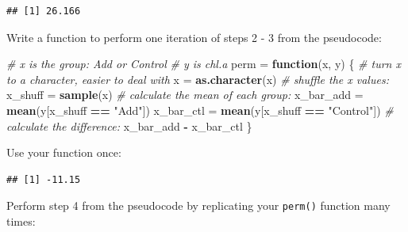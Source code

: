 \documentclass[]{book}
\newenvironment{Shaded}{\begin{snugshade}}{\end{snugshade}}
\newcommand{\KeywordTok}[1]{\textcolor[rgb]{0.13,0.29,0.53}{\textbf{#1}}}
\newcommand{\DataTypeTok}[1]{\textcolor[rgb]{0.13,0.29,0.53}{#1}}
\newcommand{\DecValTok}[1]{\textcolor[rgb]{0.00,0.00,0.81}{#1}}
\newcommand{\StringTok}[1]{\textcolor[rgb]{0.31,0.60,0.02}{#1}}
\newcommand{\CommentTok}[1]{\textcolor[rgb]{0.56,0.35,0.01}{\textit{#1}}}
\newcommand{\ControlFlowTok}[1]{\textcolor[rgb]{0.13,0.29,0.53}{\textbf{#1}}}
\newcommand{\OperatorTok}[1]{\textcolor[rgb]{0.81,0.36,0.00}{\textbf{#1}}}
\newcommand{\NormalTok}[1]{#1}
\theoremstyle{definition}
\theoremstyle{definition}
\theoremstyle{definition}
\theoremstyle{remark}
\begin{document}
\begin{verbatim}
## [1] 26.166
\end{verbatim}

Write a function to perform one iteration of steps 2 - 3 from the
pseudocode:

\begin{Shaded}
\begin{Highlighting}[]
\CommentTok{# x is the group: Add or Control}
\CommentTok{# y is chl.a}
\NormalTok{perm =}\StringTok{ }\ControlFlowTok{function}\NormalTok{(x, y) \{}
  \CommentTok{# turn x to a character, easier to deal with}
\NormalTok{  x =}\StringTok{ }\KeywordTok{as.character}\NormalTok{(x)}
  \CommentTok{# shuffle the x values:}
\NormalTok{  x_shuff =}\StringTok{ }\KeywordTok{sample}\NormalTok{(x)}
  \CommentTok{# calculate the mean of each group:}
\NormalTok{  x_bar_add =}\StringTok{ }\KeywordTok{mean}\NormalTok{(y[x_shuff }\OperatorTok{==}\StringTok{ "Add"}\NormalTok{])}
\NormalTok{  x_bar_ctl =}\StringTok{ }\KeywordTok{mean}\NormalTok{(y[x_shuff }\OperatorTok{==}\StringTok{ "Control"}\NormalTok{])}
  \CommentTok{# calculate the difference:}
\NormalTok{  x_bar_add }\OperatorTok{-}\StringTok{ }\NormalTok{x_bar_ctl}
\NormalTok{\}}
\end{Highlighting}
\end{Shaded}

Use your function once:

\begin{Shaded}
\end{Shaded}

\begin{verbatim}
## [1] -11.15
\end{verbatim}

Perform step 4 from the pseudocode by replicating your \texttt{perm()}
function many times:

\begin{Shaded}
\end{Shaded}
\end{document}
